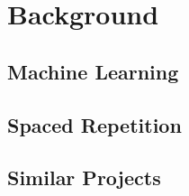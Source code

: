 \section{Background}
\label{background}

\subsection{Machine Learning} \label{background_machinelearning}
\subsection{Spaced Repetition} \label{background_spacedrepetition}
\subsection{Similar Projects} \label{background_similarprojects}

